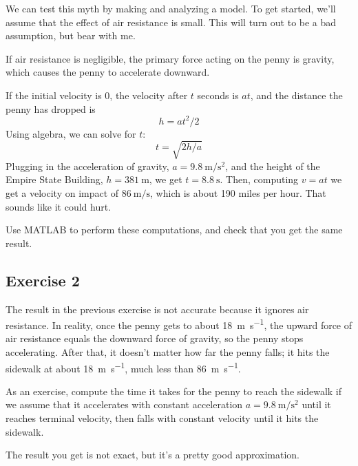
We can test this myth by making and analyzing a model.  To get started, we'll assume that the effect of air resistance is small.  This will turn out to be a bad assumption, but bear with me.

If air resistance is negligible, the primary force acting on the penny is gravity, which causes the penny to accelerate downward.


If the initial velocity is 0, the velocity after $t$ seconds is $a t$, and the distance the penny has dropped is
%
\[ h = a t^2 / 2 \]
%
Using algebra, we can solve for $t$:
%
\[ t = \sqrt{ 2 h / a} \]
%
Plugging in the acceleration of gravity, 
$a = \SI{9.8}{\meter\per\second\squared}$, and the height of the Empire State Building, 
$h = \SI{381}{\meter}$, we get 
$t = \SI{8.8}{\second}$.  
Then, computing $v = a t$ we get a velocity on impact of $\SI{86}{\meter\per\second}$, which is about 190 miles per hour.  That sounds like it could hurt.

Use MATLAB to perform these computations, and check that you get the same result.

\subsection{Exercise 2}
The result in the previous exercise is not accurate because it ignores air resistance.  In reality, once the penny gets to about \SI{18}{\meter\per\second}, the upward force of air resistance equals the downward force of gravity, so the penny stops accelerating.  After that, it doesn't matter how far the penny falls; it hits the sidewalk at about \SI{18}{\meter\per\second}, much less than \SI{86}{\meter\per\second}.

As an exercise, compute the time it takes for the penny to reach the sidewalk if we assume that it accelerates with constant acceleration
$a = \SI{9.8}{\meter\per\second\squared}$ until it reaches terminal velocity, then falls with constant velocity until it hits the sidewalk.

The result you get is not exact, but it's a pretty good approximation.



